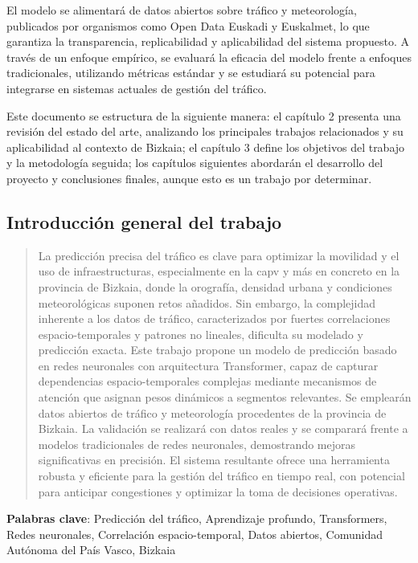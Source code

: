 El modelo se alimentará de datos abiertos sobre tráfico y meteorología, publicados por organismos como Open Data Euskadi y Euskalmet, lo que garantiza la transparencia, replicabilidad y aplicabilidad del sistema propuesto. A través de un enfoque empírico, se evaluará la eficacia del modelo frente a enfoques tradicionales, utilizando métricas estándar y se estudiará su potencial para integrarse en sistemas actuales de gestión del tráfico.

Este documento se estructura de la siguiente manera: el capítulo 2 presenta una revisión del estado del arte, analizando los principales trabajos relacionados y su aplicabilidad al contexto de Bizkaia; el capítulo 3 define los objetivos del trabajo y la metodología seguida; los capítulos siguientes abordarán el desarrollo del proyecto y conclusiones finales, aunque esto es un trabajo por determinar.

\subsection{Introducción general del trabajo}

\vspace*{\fill}
\begin{abstract}
	La predicción precisa del tráfico es clave para optimizar la movilidad y el uso de infraestructuras, especialmente en la \acrlong{capv} y más en concreto en la provincia de Bizkaia, donde la orografía, densidad urbana y condiciones meteorológicas suponen retos añadidos. Sin embargo, la complejidad inherente a los datos de tráfico, caracterizados por fuertes correlaciones espacio-temporales y patrones no lineales, dificulta su modelado y predicción exacta. Este trabajo propone un modelo de predicción basado en redes neuronales con arquitectura Transformer, capaz de capturar dependencias espacio-temporales complejas mediante mecanismos de atención que asignan pesos dinámicos a segmentos relevantes. Se emplearán datos abiertos de tráfico y meteorología procedentes de la provincia de Bizkaia. La validación se realizará con datos reales y se comparará frente a modelos tradicionales de redes neuronales, demostrando mejoras significativas en precisión. El sistema resultante ofrece una herramienta robusta y eficiente para la gestión del tráfico en tiempo real, con potencial para anticipar congestiones y optimizar la toma de decisiones operativas.
\end{abstract}
\textbf{Palabras clave}: Predicción del tráfico, Aprendizaje profundo, Transformers, Redes neuronales, Correlación espacio-temporal, Datos abiertos, Comunidad Autónoma del País Vasco, Bizkaia

